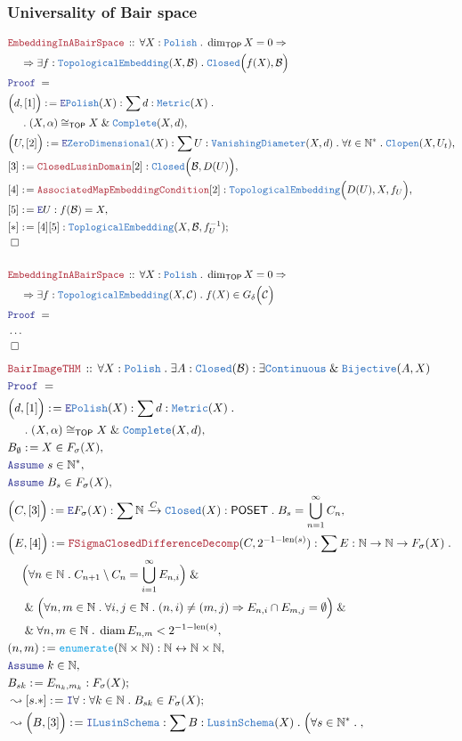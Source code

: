 \documentclass[12pt]{scrartcl}
\newcommand{\TYPE}[1]{\textcolor{NavyBlue}{\mathtt{#1}}}
\newcommand{\FUNC}[1]{\textcolor{Cerulean}{\mathtt{#1}}}
\newcommand{\LOGIC}[1]{\textcolor{Blue}{\mathtt{#1}}}
\newcommand{\THM}[1]{\textcolor{Maroon}{\mathtt{#1}}}
\renewcommand{\.}{\; . \;}
\newcommand{\de}{: \kern 0.1pc =}
\newcommand{\Theorem}[2]{& \THM{#1} \, :: \, #2 \\ & \Proof = \\ }
\newcommand{\NewLine}{\\ & \kern 1pc}
\newcommand{\Page}[1]{ \begin{align*} #1 \end{align*}   }
\newcommand{\NoProof}{ & \ldots \\ \EndProof}
\renewcommand{\And}{\; \& \;}
\newcommand{\Imply}{\Rightarrow}
\newcommand{\Intro}{\LOGIC{I}}
\newcommand{\Elim}{\LOGIC{E}}
\newcommand{\Nat}{\mathbb{N} }
\newcommand{\ToBij}{\leftrightarrow}
\newcommand{\Arrow}{\xrightarrow}
\newcommand{\Say}[3]{& #1 \de #2 : #3, \\}
\newcommand{\SayIn}[3]{& #1 \de #2 \in #3, \\}
\newcommand{\Conclude}[3]{& #1 \de #2 : #3; \\}
\newcommand{\Derive}[3]{& \leadsto #1 \de #2 : #3, \\}
\newcommand{\DeriveConclude}[3]{& \leadsto #1 \de #2 : #3 ; \\}
\newcommand{\AssumeIn}[2]{& \LOGIC{Assume} \; #1 \in #2, \\}
\newcommand{\QED}{\; \square}
\newcommand{\EndProof}{& \QED \\}
\newcommand{\Proof}{\LOGIC{Proof} \; }
\newcommand{\C}{\mathcal{C}}
\newcommand{\B}{\mathcal{B}}
\newcommand{\POSET}{\mathsf{POSET}}
\newcommand{\Clopen}{\TYPE{Clopen}}
\newcommand{\Closed}{\TYPE{Closed}}
\newcommand{\TOP}{\mathsf{TOP}}
\newcommand{\Complete}{\TYPE{Complete}}
\DeclareMathOperator{\diam}{diam}
\newcommand{\FS}[1]{{#1}{}^*}
\newcommand{\Polish}{\TYPE{Polish}}
\DeclareMathOperator{\len}{len}
\begin{document}
\subsubsection{Universality of Bair space}
\Page{
	\Theorem{EmbeddingInABairSpace}
	{
		\forall X : \TYPE{Polish} \.
		\dim_\TOP X = 0
		\Imply
		\NewLine
		\Imply
		\exists f : \TYPE{TopologicalEmbedding}(X,\B) \.
		\TYPE{Closed}\Big( f(X), \B \Big)
	}
	\Say{\Big(d,[1]\Big)}
	{
		\Elim \TYPE{Polish}(X) 
	}
	{
		\sum d : \TYPE{Metric}(X) \. 
		\NewLine \.
		(X,\alpha) \cong_\TOP X \And \Complete(X,d)  
	}
	\Say{\Big(U,[2]\Big)}{\Elim \TYPE{ZeroDimensional}(X)}
	{
		\sum U : \TYPE{VanishingDiameter}(X,d) \. 
		\forall t \in \FS{\Nat} \.
		\Clopen(X,U_t)
	}
	\Say{[3]}{\THM{ClosedLusinDomain}[2]}{\Closed\Big(\B,D(U)\Big)}
	\Say{[4]}{\THM{AssociatedMapEmbeddingCondition}[2]}{\TYPE{TopologicalEmbedding}\Big(D(U),X,f_U\Big)}
	\Say{[5]}{\Elim U}{f(\B) = X}
	\Conclude{[*]}{[4][5]}{\TYPE{ToplogicalEmbedding}(X,\B,f_U^{-1})}
	\EndProof
	\\
	\Theorem{EmbeddingInABairSpace}
	{
		\forall X : \Polish \.
		\dim_\TOP X = 0
		\Imply
		\NewLine
		\Imply
		\exists f : \TYPE{TopologicalEmbedding}(X,\C) \.
		f(X) \in G_\delta\Big( \C \Big)
	}
	\NoProof
}\Page{
	\Theorem{BairImageTHM}
	{
		\forall X : \Polish \.
		\exists A : \Closed(\B) :
		\exists \TYPE{Continuous} \And \TYPE{Bijective}(A,X)
	}
	\Say{\Big(d,[1]\Big)}
	{
		\Elim \TYPE{Polish}(X) 
	}
	{
		\sum d : \TYPE{Metric}(X) \. 
		\NewLine \.
		(X,\alpha) \cong_\TOP X \And \Complete(X,d)  
	}
	\SayIn{B_\emptyset}{X}{F_\sigma(X)}
	\AssumeIn{s}{\FS{\Nat}}
	\AssumeIn{B_s}{F_\sigma(X)}
	\Say{\Big(C,[3]\Big)}{\Elim F_\sigma(X)}
	{
		\sum \Nat \Arrow{C} \Closed(X) : \POSET \.
		B_s = \bigcup^\infty_{n=1} C_n
	}
	\Say{\Big(E,[4]\Big)}{\THM{FSigmaClosedDifferenceDecomp}(C,2^{-1-\len(s)})}
	{
			\sum E : \Nat  \to \Nat \to F_\sigma(X) \.
			\NewLine
			\Big(
			\forall n \in \Nat \. C_{n+1} \setminus C_n = \bigcup^\infty_{i=1} E_{n,i}
			\Big)
			\And \NewLine \And
			\Big(
				\forall n,m \in \Nat \.
				\forall i,j \in \Nat \.
				(n,i) \neq (m,j) 
				\Imply
				E_{n,i} \cap E_{m,j} = \emptyset
			\Big)
			\And \NewLine \And
			\forall n,m \in \Nat \.
			\diam E_{n,m} < 2^{-1 - \len(s)}
	}
	\Say{(n,m)}{\FUNC{enumerate}(\Nat \times \Nat)}{\Nat \ToBij \Nat \times \Nat}
	\AssumeIn{k}{\Nat}
	\Conclude{B_{sk}}{E_{n_k,m_k}}{F_\sigma(X)}
	\DeriveConclude{[s.*]}{\Intro \forall}{\forall k \in \Nat \. B_{sk} \in F_\sigma(X)}
	\Derive{\Big(B,[3]\Big)}{\Intro \TYPE{LusinSchema}}
	{
		\sum B : \TYPE{LusinSchema}(X) \.
		\Big(
			\forall s \in \FS{\Nat} \.
}}
\end{document}
